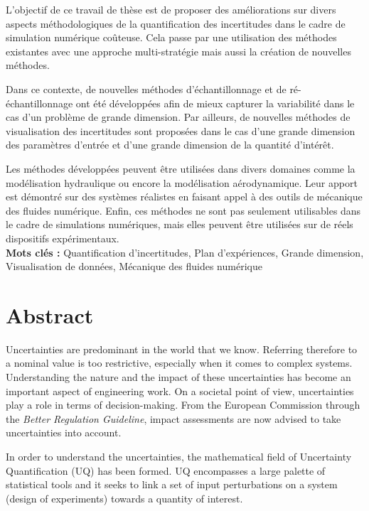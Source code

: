 L'objectif de ce travail de thèse est de proposer des améliorations sur divers aspects méthodologiques de la quantification des incertitudes dans le cadre de simulation numérique coûteuse. Cela passe par une utilisation des méthodes existantes avec une approche multi-stratégie mais aussi la création de nouvelles méthodes.

Dans ce contexte, de nouvelles méthodes d'échantillonnage et de ré-échantillonnage ont été développées afin de mieux capturer la variabilité dans le cas d'un problème de grande dimension. Par ailleurs, de nouvelles méthodes de visualisation des incertitudes sont proposées dans le cas d'une grande dimension des paramètres d'entrée et d'une grande dimension de la quantité d'intérêt.

Les méthodes développées peuvent être utilisées dans divers domaines comme la modélisation hydraulique ou encore la modélisation aérodynamique. Leur apport est démontré sur des systèmes réalistes en faisant appel à des outils de mécanique des fluides numérique. Enfin, ces méthodes ne sont pas seulement utilisables dans le cadre de simulations numériques, mais elles peuvent être utilisées sur de réels dispositifs expérimentaux.\\

\textbf{Mots clés :} Quantification d'incertitudes, Plan d'expériences, Grande dimension, Visualisation de données, Mécanique des fluides numérique %


\chapter*{Abstract}

Uncertainties are predominant in the world that we know. Referring therefore to a nominal value is too restrictive, especially when it comes to complex systems. Understanding the nature and the impact of these uncertainties has become an important aspect of engineering work. On a societal point of view, uncertainties play a role in terms of decision-making. From the European Commission through the \emph{Better Regulation Guideline}, impact assessments are now advised to take uncertainties into account.

In order to understand the uncertainties, the mathematical field of Uncertainty Quantification (UQ) has been formed. UQ encompasses a large palette of statistical tools and it seeks to link a set of input perturbations on a system (design of experiments) towards a quantity of interest.

